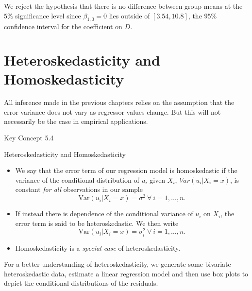 \documentclass[]{book}
\theoremstyle{definition}
\theoremstyle{definition}
\theoremstyle{definition}
\theoremstyle{remark}
\begin{document}
We reject the hypothesis that there is no difference between group means
at the \(5\%\) significance level since \(\beta_{1,0} = 0\) lies outside
of \([3.54, 10.8]\), the \(95\%\) confidence interval for the
coefficient on \(D\).

\section{Heteroskedasticity and
Homoskedasticity}\label{heteroskedasticity-and-homoskedasticity}

All inference made in the previous chapters relies on the assumption
that the error variance does not vary as regressor values change. But
this will not necessarily be the case in empirical applications.

Key Concept 5.4

Heteroskedasticity and Homoskedasticity

\begin{itemize}
\item
  We say that the error term of our regression model is homoskedastic if
  the variance of the conditional distribution of \(u_i\) given \(X_i\),
  \(Var(u_i|X_i=x)\), is constant \emph{for all} observations in our
  sample \[ \text{Var}(u_i|X_i=x) = \sigma^2 \ \forall \ i=1,\dots,n. \]
\item
  If instead there is dependence of the conditional variance of \(u_i\)
  on \(X_i\), the error term is said to be heteroskedastic. We then
  write
  \[ \text{Var}(u_i|X_i=x) = \sigma_i^2 \ \forall \ i=1,\dots,n. \]
\item
  Homoskedasticity is a \emph{special case} of heteroskedasticity.
\end{itemize}

For a better understanding of heteroskedasticity, we generate some
bivariate heteroskedastic data, estimate a linear regression model and
then use box plots to depict the conditional distributions of the
residuals.
\end{document}
